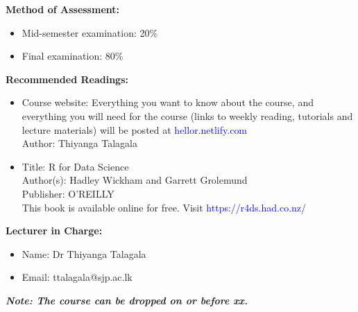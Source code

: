 \documentclass[a4paper,12pt]{article}
\begin{document}
\noindent\textbf{Method of Assessment:}
\begin{itemize}
	\setlength\itemsep{0.1mm}
	\item Mid-semester examination: 20\%
	\item Final examination: 80\%
\end{itemize}

\noindent\textbf{Recommended Readings:}
\begin{itemize}
	\setlength\itemsep{0.1mm}
	\item Course website: Everything you want to know about the course, and everything you will need for the course (links to weekly reading, tutorials and lecture materials) will be posted at \textcolor{blue}{hellor.netlify.com}\\
	Author: Thiyanga Talagala
	\item Title: R for Data Science \\
		  Author(s): Hadley Wickham and Garrett Grolemund \\
		  Publisher: O'REILLY \\
		  This book is available online for free. Visit \textcolor{blue}{https://r4ds.had.co.nz/}
\end{itemize}

\noindent\textbf{Lecturer in Charge:}

\begin{itemize}
	\setlength\itemsep{0.1mm}
	\item[] Name: Dr Thiyanga  Talagala
	\item[] Email: ttalagala@sjp.ac.lk
\end{itemize}


\noindent\textbf{\textit{Note: The course can be dropped on or before xx.}}
\end{document}
